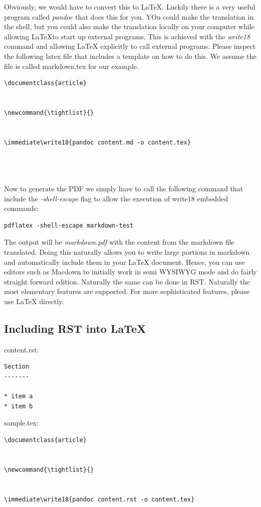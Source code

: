 Obviously, we would have to convert this to LaTeX. Luckily there is a
very useful program called {\em pandoc} that does this for you. YOu
could make the translation in the shell, but you could also make the
translation locally on your computer while allowing \LaTeX to start up
external programs. This is achieved with the {\em write18} command and
allowing LaTeX explicitly to call external programs. Please inspect
the following latex file that includes a template on how to do
this. We assume the file is called markdown.tex for our example.

\begin{verbatim}
\documentclass{article}


\newcommand{\tightlist}{}


\immediate\write18{pandoc content.md -o content.tex}




\end{verbatim}

Now to generate the PDF we simply have to call the following command
that include the {\em -shell-escape} flag to allow the execution of
write18 embedded commands:

\begin{verbatim}
pdflatex -shell-escape markdown-test
\end{verbatim}

The output will be {\em markdown.pdf} with the content from the
markdown file translated. Doing this naturally allows you to write
large portions in markdown and automatically include them in your
LaTeX document. Hence, you can use editors such as Macdown to initially
work in semi WYSIWYG mode and do fairly straight forward
edition. Naturally the same can be done in RST. Naturally the most
elementary features are supported. For more sophisticated features,
please use LaTeX directly.


\subsection{Including RST into LaTeX}

content.rst:

\begin{verbatim}
Section
-------

* item a
* item b
\end{verbatim}

sample.tex:

\begin{verbatim}
\documentclass{article}


\newcommand{\tightlist}{}


\immediate\write18{pandoc content.rst -o content.tex}




\end{verbatim}


